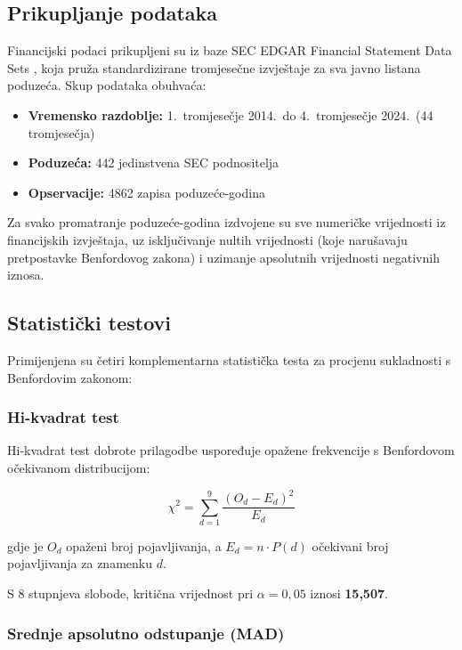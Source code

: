 \documentclass[12pt,a4paper]{article}
\begin{document}
\subsection{Prikupljanje podataka}

Financijski podaci prikupljeni su iz baze SEC EDGAR Financial Statement Data Sets \citep{sec2024}, koja pruža standardizirane tromjesečne izvještaje za sva javno listana poduzeća. Skup podataka obuhvaća:

\begin{itemize}
    \item \textbf{Vremensko razdoblje:} 1.\ tromjesečje 2014.\ do 4.\ tromjesečje 2024.\ (44 tromjesečja)
    \item \textbf{Poduzeća:} 442 jedinstvena SEC podnositelja
    \item \textbf{Opservacije:} 4862 zapisa poduzeće-godina
\end{itemize}

Za svako promatranje poduzeće-godina izdvojene su sve numeričke vrijednosti iz financijskih izvještaja, uz isključivanje nultih vrijednosti (koje narušavaju pretpostavke Benfordovog zakona) i uzimanje apsolutnih vrijednosti negativnih iznosa.

\subsection{Statistički testovi}

Primijenjena su četiri komplementarna statistička testa za procjenu sukladnosti s Benfordovim zakonom:

\subsubsection{Hi-kvadrat test}

Hi-kvadrat test dobrote prilagodbe uspoređuje opažene frekvencije s Benfordovom očekivanom distribucijom:

\begin{equation}
\chi^2 = \sum_{d=1}^{9} \frac{(O_d - E_d)^2}{E_d}
\end{equation}

gdje je $O_d$ opaženi broj pojavljivanja, a $E_d = n \cdot P(d)$ očekivani broj pojavljivanja za znamenku $d$.

S 8 stupnjeva slobode, kritična vrijednost pri $\alpha = 0{,}05$ iznosi \textbf{15,507}.

\subsubsection{Srednje apsolutno odstupanje (MAD)}
\end{document}
